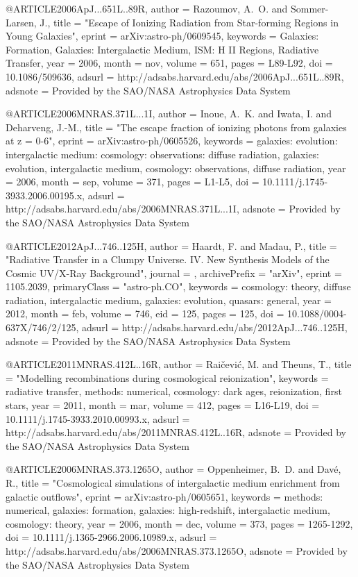 \documentclass{article}
\begin{document}
@ARTICLE{2006ApJ...651L..89R,
   author = {{Razoumov}, A.~O. and {Sommer-Larsen}, J.},
    title = "{Escape of Ionizing Radiation from Star-forming Regions in Young Galaxies}",
   eprint = {arXiv:astro-ph/0609545},
 keywords = {Galaxies: Formation, Galaxies: Intergalactic Medium, ISM: H II Regions, Radiative Transfer},
     year = 2006,
    month = nov,
   volume = 651,
    pages = {L89-L92},
      doi = {10.1086/509636},
   adsurl = {http://adsabs.harvard.edu/abs/2006ApJ...651L..89R},
  adsnote = {Provided by the SAO/NASA Astrophysics Data System}
}

@ARTICLE{2006MNRAS.371L...1I,
   author = {{Inoue}, A.~K. and {Iwata}, I. and {Deharveng}, J.-M.},
    title = "{The escape fraction of ionizing photons from galaxies at z = 0-6}",
   eprint = {arXiv:astro-ph/0605526},
 keywords = {galaxies: evolution: intergalactic medium: cosmology: observations: diffuse radiation, galaxies: evolution, intergalactic medium, cosmology: observations, diffuse radiation},
     year = 2006,
    month = sep,
   volume = 371,
    pages = {L1-L5},
      doi = {10.1111/j.1745-3933.2006.00195.x},
   adsurl = {http://adsabs.harvard.edu/abs/2006MNRAS.371L...1I},
  adsnote = {Provided by the SAO/NASA Astrophysics Data System}
}

@ARTICLE{2012ApJ...746..125H,
   author = {{Haardt}, F. and {Madau}, P.},
    title = "{Radiative Transfer in a Clumpy Universe. IV. New Synthesis Models of the Cosmic UV/X-Ray Background}",
  journal = {\apj},
archivePrefix = "arXiv",
   eprint = {1105.2039},
 primaryClass = "astro-ph.CO",
 keywords = {cosmology: theory, diffuse radiation, intergalactic medium, galaxies: evolution, quasars: general},
     year = 2012,
    month = feb,
   volume = 746,
      eid = {125},
    pages = {125},
      doi = {10.1088/0004-637X/746/2/125},
   adsurl = {http://adsabs.harvard.edu/abs/2012ApJ...746..125H},
  adsnote = {Provided by the SAO/NASA Astrophysics Data System}
}

@ARTICLE{2011MNRAS.412L..16R,
   author = {{Rai{\v c}evi{\'c}}, M. and {Theuns}, T.},
    title = "{Modelling recombinations during cosmological reionization}",
 keywords = {radiative transfer, methods: numerical, cosmology: dark ages, reionization, first stars},
     year = 2011,
    month = mar,
   volume = 412,
    pages = {L16-L19},
      doi = {10.1111/j.1745-3933.2010.00993.x},
   adsurl = {http://adsabs.harvard.edu/abs/2011MNRAS.412L..16R},
  adsnote = {Provided by the SAO/NASA Astrophysics Data System}
}

@ARTICLE{2006MNRAS.373.1265O,
   author = {{Oppenheimer}, B.~D. and {Dav{\'e}}, R.},
    title = "{Cosmological simulations of intergalactic medium enrichment from galactic outflows}",
   eprint = {arXiv:astro-ph/0605651},
 keywords = {methods: numerical, galaxies: formation, galaxies: high-redshift, intergalactic medium, cosmology: theory},
     year = 2006,
    month = dec,
   volume = 373,
    pages = {1265-1292},
      doi = {10.1111/j.1365-2966.2006.10989.x},
   adsurl = {http://adsabs.harvard.edu/abs/2006MNRAS.373.1265O},
  adsnote = {Provided by the SAO/NASA Astrophysics Data System}
}
\end{document}
